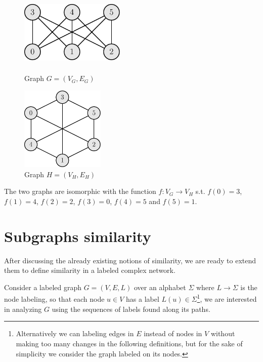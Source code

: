 \begin{esempio}
	\begin{figure}[h]
		\centering
		\begin{minipage}[t]{.45\textwidth}
			\centering
			\includegraphics[width=5cm,height=3.33cm]{figure/figure-2-3}
			\caption{Graph $G=(V_G, E_G)$}
		\end{minipage}\hfill
		\begin{minipage}[t]{.45\textwidth}
			\centering
			\includegraphics[width=4cm,height=4cm]{figure/figure-2-4}
			\caption{Graph $H=(V_H, E_H)$}
		\end{minipage}
	\end{figure}
	
	The two graphs are isomorphic with the function $f : V_{G} \rightarrow V_{H}$ s.t. $f(0) = 3$, $f(1) = 4$, $f(2) = 2$, $f(3) = 0$, $f(4) = 5$ and $f(5) = 1$. 
	
\end{esempio}

\section{Subgraphs similarity}

After discussing the already existing notions of similarity, we are ready to extend them to define similarity in a labeled complex network.\medskip

Consider a labeled graph $G = (V, E, L)$ over an alphabet $\Sigma$ where $L \rightarrow \Sigma$ is the node labeling, so that each node $u \in V$ has a label $L(u) \in \Sigma$\footnote{Alternatively we can labeling edges in $E$ instead of nodes in $V$ without making too many changes in the following definitions, but for the sake of simplicity we consider the graph labeled on its nodes.}, we are interested in analyzing $G$ using the sequences of labels found along  its paths.\medskip

